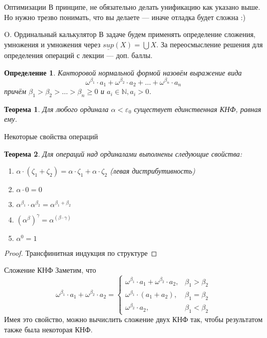 \documentclass[aspectratio=169]{beamer}
\newtheorem{thm}{Теорема}[section]
\newtheorem{dfn}{Определение}[section]
\begin{document}
\begin{frame}{Оптимизации}
В принципе, не обязательно делать унификацию как указано выше. Но нужно трезво понимать, что вы делаете --- иначе 
отладка будет сложна :)
\end{frame}

\begin{frame}{O. Ординальный калькулятор}
В задаче будем применять определение сложения, умножения и умножения через $\underline{sup}(X) = \bigcup X$.
За переосмысление решения для определения операций с лекции --- доп. баллы.
\begin{dfn}Канторовой нормальной формой назовём выражение вида
$$\omega^{\beta_1}\cdot a_1 + \omega^{\beta_2}\cdot a_2 + \dots + \omega^{\beta_n} \cdot a_n$$
причём $\beta_1 > \beta_2 > \dots > \beta_n \ge 0$ и $a_i \in \mathbb{N}, a_i > 0$.
\end{dfn}

\begin{thm}Для любого ординала $\alpha < \varepsilon_0$ существует единственная КНФ, равная ему.\end{thm}
\end{frame}

\begin{frame}{Некоторые свойства операций}
\begin{thm}Для операций над ординалами выполнены следующие свойства:
\begin{enumerate}
\item $\alpha\cdot(\zeta_1+\zeta_2) = \alpha\cdot\zeta_1 + \alpha\cdot\zeta_2$ (левая дистрибутивность)
\item $\alpha\cdot 0 = 0$
\item $\alpha^{\beta_1}\cdot\alpha^{\beta_2} = \alpha^{\beta_1+\beta_2}$
\item $(\alpha^\beta)^\gamma = \alpha^(\beta\cdot\gamma)$
\item $\alpha^0 = 1$
\end{enumerate}
\end{thm}
\begin{proof}Трансфинитная индукция по структуре\end{proof}
\end{frame}

\begin{frame}{Сложение КНФ}
Заметим, что $$\omega^{\beta_1}\cdot a_1 + \omega^{\beta_2}\cdot a_2 = \left\{\begin{array}{ll}
\omega^{\beta_1}\cdot a_1 + \omega^{\beta_2}\cdot a_2, & \beta_1 > \beta_2\\
\omega^{\beta_1}\cdot (a_1 + a_2), & \beta_1 = \beta_2\\
\omega^{\beta_2}\cdot a_2, & \beta_1 < \beta_2\end{array}\right.$$
Имея это свойство, можно вычислить сложение двух КНФ так, чтобы результатом также была некоторая КНФ.
\end{frame}
\end{document}
